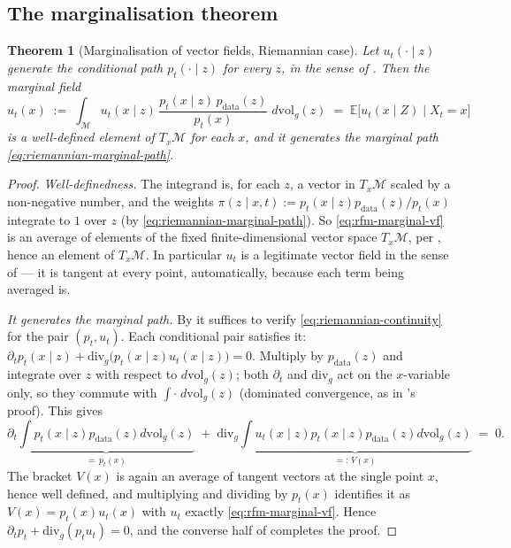 \documentclass[11pt,a4paper]{report}
\newtheorem{theorem}{Theorem}[chapter]
\theoremstyle{definition}
\theoremstyle{remark}
\newcommand{\EE}{\mathbb E}
\begin{document}
\subsection{The marginalisation theorem}

\begin{theorem}[Marginalisation of vector fields, Riemannian case]
\label{thm:rfm-marginalisation}
Let $u_t(\cdot\mid z)$ generate the conditional path $p_t(\cdot\mid z)$ for
every $z$, in the sense of . Then the
marginal field
\begin{equation}
\label{eq:rfm-marginal-vf}
u_t(x) \;:=\; \int_{\mathcal M} u_t(x\mid z)\,\frac{p_t(x\mid z)\,p_{\mathrm{data}}(z)}{p_t(x)}\;d\mathrm{vol}_g(z)
\;=\;\EE\bigl[u_t(x\mid Z)\;\big|\;X_t=x\bigr]
\end{equation}
is a well-defined element of $T_x\mathcal M$ for each $x$, and it generates
the marginal path \eqref{eq:riemannian-marginal-path}.
\end{theorem}

\begin{proof}
\emph{Well-definedness.} The integrand is, for each $z$, a vector in
$T_x\mathcal M$ scaled by a non-negative number, and the weights
$\pi(z\mid x,t):=p_t(x\mid z)p_{\mathrm{data}}(z)/p_t(x)$ integrate to $1$
over $z$ (by \eqref{eq:riemannian-marginal-path}). So
\eqref{eq:rfm-marginal-vf} is an average of elements of the fixed
finite-dimensional vector space $T_x\mathcal M$, per
, hence an element of $T_x\mathcal M$. In
particular $u_t$ is a legitimate vector field in the sense of
 --- it is tangent at every point, automatically,
because each term being averaged is.

\emph{It generates the marginal path.} By
 it suffices to verify
\eqref{eq:riemannian-continuity} for the pair $(p_t,u_t)$. Each conditional
pair satisfies it:
$\partial_tp_t(x\mid z)+\mathrm{div}_g\bigl(p_t(x\mid z)u_t(x\mid z)\bigr)=0$.
Multiply by $p_{\mathrm{data}}(z)$ and integrate over $z$ with respect to
$d\mathrm{vol}_g(z)$; both $\partial_t$ and $\mathrm{div}_g$ act on the
$x$-variable only, so they commute with $\int\cdot\;d\mathrm{vol}_g(z)$
(dominated convergence, as in 's
proof). This gives
\[
\partial_t\underbrace{\int p_t(x\mid z)p_{\mathrm{data}}(z)d\mathrm{vol}_g(z)}_{=\,p_t(x)}
\;+\;
\mathrm{div}_g\underbrace{\int u_t(x\mid z)p_t(x\mid z)p_{\mathrm{data}}(z)d\mathrm{vol}_g(z)}_{=:\,V(x)}
\;=\;0 .
\]
The bracket $V(x)$ is again an average of tangent vectors at the single
point $x$, hence well defined, and multiplying and dividing by $p_t(x)$
identifies it as $V(x)=p_t(x)u_t(x)$ with $u_t$ exactly
\eqref{eq:rfm-marginal-vf}. Hence
$\partial_tp_t+\mathrm{div}_g(p_tu_t)=0$, and the converse half of
 completes the proof.
\end{proof}
\end{document}
